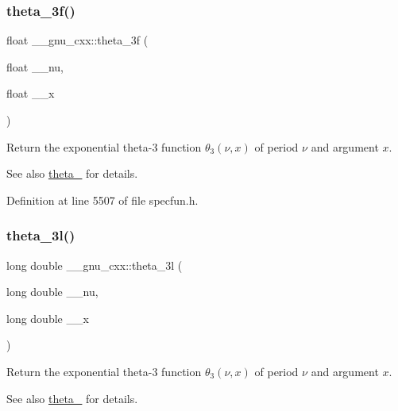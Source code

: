 \subsubsection{\texorpdfstring{theta\+\_\+3f()}{theta\_3f()}}
{\footnotesize\ttfamily float \+\_\+\+\_\+gnu\+\_\+cxx\+::theta\+\_\+3f (\begin{DoxyParamCaption}\item[{float}]{\+\_\+\+\_\+nu,  }\item[{float}]{\+\_\+\+\_\+x }\end{DoxyParamCaption})\hspace{0.3cm}{\ttfamily [inline]}}

Return the exponential theta-\/3 function $ \theta_3(\nu,x) $ of period $ \nu $ and argument $ x $.

\begin{DoxySeeAlso}{See also}
\hyperlink{group__gnu__math__spec__func_ga146c3b8e86991e164d4bf143cda5f0fc}{theta\+\_} for details. 
\end{DoxySeeAlso}


Definition at line 5507 of file specfun.\+h.

\mbox{\label{group__gnu__math__spec__func_gaf88874ff6c69940d2191f7947d2ea119}} 
\subsubsection{\texorpdfstring{theta\+\_\+3l()}{theta\_3l()}}
{\footnotesize\ttfamily long double \+\_\+\+\_\+gnu\+\_\+cxx\+::theta\+\_\+3l (\begin{DoxyParamCaption}\item[{long double}]{\+\_\+\+\_\+nu,  }\item[{long double}]{\+\_\+\+\_\+x }\end{DoxyParamCaption})\hspace{0.3cm}{\ttfamily [inline]}}

Return the exponential theta-\/3 function $ \theta_3(\nu,x) $ of period $ \nu $ and argument $ x $.

\begin{DoxySeeAlso}{See also}
\hyperlink{group__gnu__math__spec__func_ga146c3b8e86991e164d4bf143cda5f0fc}{theta\+\_} for details. 
\end{DoxySeeAlso}


